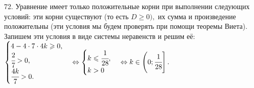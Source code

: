 72. Уравнение имеет только положительные корни при выполнении следующих условий: эти корни существуют (то есть $D\geqslant0),$ их сумма и произведение положительны (эти условия мы будем проверять при помощи теоремы Виета). Запишем эти условия в виде системы неравенств и решим её: $\begin{cases} 4-4\cdot7\cdot4k\geqslant0,\\
\cfrac{2}{7}>0,\\ \cfrac{4k}{7}>0.\end{cases}\Leftrightarrow\begin{cases} k\leqslant\cfrac{1}{28},\\ k>0\end{cases}\Leftrightarrow
k\in \left(0;\cfrac{1}{28}\right].$\\
